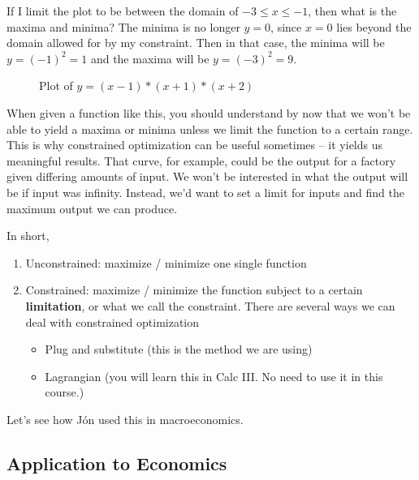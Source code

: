 \documentclass[11pt]{scrartcl}
\newcommand{\jon}{Jón }
\begin{document}
If I limit the plot to be between the domain of $-3 \leq x \leq -1$, then what is the maxima and minima? The minima is no longer $y=0$, since $x=0$ lies beyond the domain allowed for by my constraint. Then in that case, the minima will be $y = (-1)^2 = 1$ and the maxima will be $y = (-3)^2 = 9$.

\begin{figure}[H]
\centering
{}
\caption{Plot of $y = (x-1)*(x+1)*(x+2)$}
\end{figure}

When given a function like this, you should understand by now that we won't be able to yield a maxima or minima unless we limit the function to a certain range. This is why constrained optimization can be useful sometimes -- it yields us meaningful results. That curve, for example, could be the output for a factory given differing amounts of input. We won't be interested in what the output will be if input was infinity. Instead, we'd want to set a limit for inputs and find the maximum output we can produce.

In short, 

\begin{enumerate}
	\item Unconstrained: maximize / minimize one single function
	\item Constrained: maximize / minimize the function subject to a certain \textbf{limitation}, or what we call the constraint. There are several ways we can deal with constrained optimization
	\begin{itemize}
		\item Plug and substitute (this is the method we are using)
		\item Lagrangian (you will learn this in Calc III. No need to use it in this course.)
	\end{itemize}
\end{enumerate}

Let's see how \jon used this in macroeconomics.

\subsection{Application to Economics}
\end{document}
